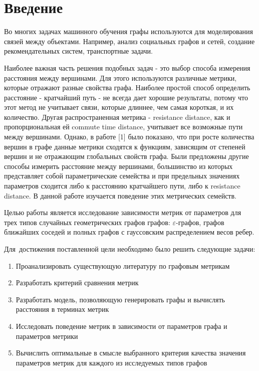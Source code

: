 \chapter*{Введение}							%

Во многих задачах машинного обучения графы используются для моделирования связей между объектами. Например, анализ социальных графов и сетей, создание рекомендательных систем, транспортные задачи.

Наиболее важная часть решения подобных задач - это выбор способа измерения расстояния между вершинами. Для этого используются различные метрики, которые отражают разные свойства графа. Наиболее простой способ определить расстояние - кратчайший путь - не всегда дает хорошие результаты, потому что этот метод не учитывает связи, которые длиннее, чем самая короткая, и их количество. Другая распространенная метрика - resistance distance, как и пропорциональная ей commute time distance, учитывает все возможные пути между вершинами. Однако, в работе [1] было показано, что при росте количества вершин в графе данные метрики сходятся к функциям, зависящим от степеней вершин и не отражающим глобальных свойств графа. Были предложены другие способы измерить расстояние между вершинами, большинство из которых представляет собой параметрические семейства и при предельных значениях параметров сходится либо к расстоянию кратчайшего пути, либо к resistance distance. В данной работе изучается поведение этих метрических семейств.

Целью работы является исследование зависимости метрик от параметров для трех типов случайных геометрических графов графов:  $\varepsilon$-графов, графов ближайших соседей и полных графов с гауссовским распределением весов ребер.

Для~достижения поставленной цели необходимо было решить следующие задачи:
\begin{enumerate}
  \item Проанализировать существующую литературу по графовым метрикам  
  \item Разработать критерий сравнения метрик
  \item Разработать модель, позволяющую генерировать графы и вычислять расстояния в терминах метрик   
  \item Исследовать поведение метрик в зависимости от параметров графа и параметров метрики
  \item Вычислить оптимальные в смысле выбранного критерия качества значения параметров метрик для каждого из исследуемых типов графов
\end{enumerate}



\clearpage